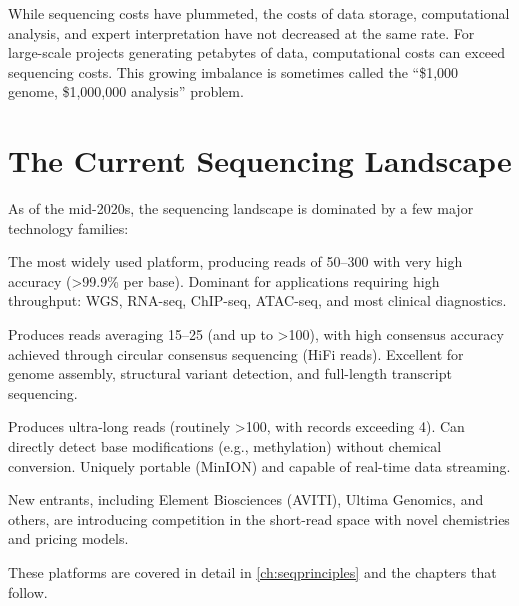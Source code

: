 \begin{warningbox}
While sequencing costs have plummeted, the costs of data storage, computational analysis, and expert interpretation have not decreased at the same rate. For large-scale projects generating petabytes of data, computational costs can exceed sequencing costs. This growing imbalance is sometimes called the ``\$1,000 genome, \$1,000,000 analysis'' problem.
\end{warningbox}


\section{The Current Sequencing Landscape}
\label{sec:intro:landscape}

As of the mid-2020s, the sequencing landscape is dominated by a few major technology families:

\begin{description}[style=nextline, itemsep=4pt]
  \item[Short-read sequencing (Illumina)] The most widely used platform, producing reads of 50--300\basepair{} with very high accuracy (>99.9\% per base). Dominant for applications requiring high throughput: \acrshort{WGS}, \acrshort{RNA-seq}, \acrshort{ChIP-seq}, \acrshort{ATAC-seq}, and most clinical diagnostics.

  \item[Long-read sequencing (PacBio SMRT)] Produces reads averaging 15--25\kilobase{} (and up to >100\kilobase{}), with high consensus accuracy achieved through circular consensus sequencing (HiFi reads). Excellent for genome assembly, structural variant detection, and full-length transcript sequencing.

  \item[Long-read sequencing (Oxford Nanopore)] Produces ultra-long reads (routinely >100\kilobase{}, with records exceeding 4\megabase{}). Can directly detect base modifications (e.g., methylation) without chemical conversion. Uniquely portable (MinION) and capable of real-time data streaming.

  \item[Emerging platforms] New entrants, including Element Biosciences (AVITI), Ultima Genomics, and others, are introducing competition in the short-read space with novel chemistries and pricing models.
\end{description}

These platforms are covered in detail in \cref{ch:seqprinciples} and the chapters that follow.


